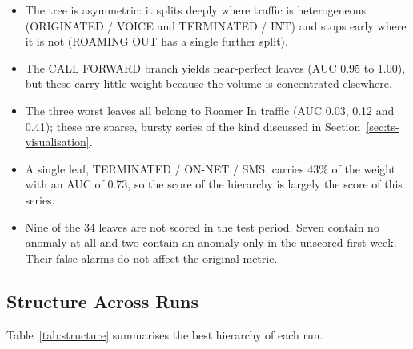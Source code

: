\begin{itemize}
    \item The tree is asymmetric: it splits deeply where traffic is heterogeneous (ORIGINATED / VOICE and TERMINATED / INT) and stops early where it is not (ROAMING OUT has a single further split).
    \item The CALL FORWARD branch yields near-perfect leaves (\ac{AUC} 0.95 to 1.00), but these carry little weight because the volume is concentrated elsewhere.
    \item The three worst leaves all belong to Roamer In traffic (\ac{AUC} 0.03, 0.12 and 0.41); these are sparse, bursty series of the kind discussed in Section~\ref{sec:ts-visualisation}.
    \item A single leaf, TERMINATED / ON-NET / SMS, carries 43\% of the weight with an \ac{AUC} of 0.73, so the score of the hierarchy is largely the score of this series.
    \item Nine of the 34 leaves are not scored in the test period. Seven contain no anomaly at all and two contain an anomaly only in the unscored first week. Their false alarms do not affect the original metric.
\end{itemize}

\subsection{Structure Across Runs}

Table~\ref{tab:structure} summarises the best hierarchy of each run.

